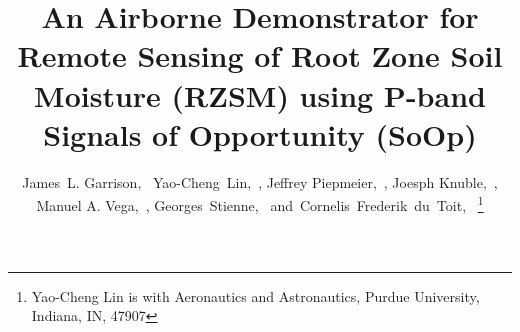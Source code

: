 \documentclass[draftcls,onecolumn]{IEEEtran}  %
\begin{document}
%
\title{An Airborne Demonstrator for Remote Sensing of Root Zone Soil Moisture (RZSM) using P-band Signals of Opportunity (SoOp)}
%
%
%

\author{James~L. Garrison,~
        Yao-Cheng~Lin,~,
        Jeffrey Piepmeier,~,
        Joesph Knuble,~,
        Manuel A. Vega,~,
        Georges~Stienne,~
        and~Cornelis~Frederik~du~Toit,~%
\thanks{Yao-Cheng Lin is with Aeronautics and Astronautics, Purdue University, Indiana,
IN, 47907}}

% 
%
\end{document}
